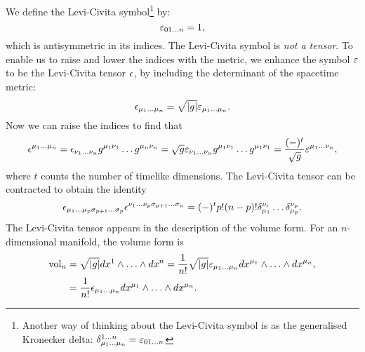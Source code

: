 We define the Levi-Civita symbol\footnote{Another way of thinking about the Levi-Civita symbol is as the generalised Kronecker delta: $\delta^{1 \ldots n}_{\mu_1 \ldots \mu_n} = {\varepsilon}_{01...n}$} by:
\begin{equation*}
	{\varepsilon}_{01...n} = 1 ,
\end{equation*}
which is antisymmetric in its indices. The Levi-Civita symbol is \emph{not a tensor}. To enable us to raise and lower the indices with the metric, we enhance the symbol ${\varepsilon}$ to be the Levi-Civita tensor ${\epsilon}$, by including the determinant of the spacetime metric:
\begin{equation*}
	{\epsilon}_{\mu_1 \ldots \mu_n} = \sqrt{|g|} {\varepsilon}_{\mu_1 \ldots \mu_n}.
\end{equation*}
Now we can raise the indices to find that
\begin{equation*}
	{\epsilon}^{\mu_1 \ldots \mu_n} = {\epsilon}_{\nu_1 \ldots \nu_n} g^{\mu_1 \nu_1} \ldots g^{\mu_n \nu_n} = \sqrt{g} {\varepsilon}_{\nu_1 \ldots \nu_n} g^{\mu_1 \nu_1} \ldots g^{\mu_1 \nu_1} = \frac{(-)^t}{\sqrt{g}} {\varepsilon}^{\mu_1 \ldots \nu_n},
\end{equation*}
where $t$ counts the number of timelike dimensions. The Levi-Civita tensor can be contracted to obtain the identity
\begin{equation*}
	{\epsilon}_{\mu_1 \ldots \mu_p \sigma_{p+1} \ldots \sigma_p} {\epsilon}^{\nu_1 \ldots \nu_p \sigma_{p+1} \ldots \sigma_n} = (-)^t p! (n-p)! \delta_{\mu_1}^{\nu_i} \ldots \delta_{\mu_p}^{\nu_p}.
\end{equation*}
The Levi-Civita tensor appears in the description of the volume form. For an $n$-dimensional manifold, the volume form is
\begin{equation*}
\begin{aligned}
	\text{vol}_n &= \sqrt{|g|} dx^{1} \wedge \ldots \wedge dx^{n} = \frac{1}{n!} \sqrt{|g|}  {\varepsilon}_{\mu_1 \ldots \mu_n} dx^{\mu_1} \wedge \ldots \wedge dx^{\mu_n}, \\
	&= \frac{1}{n!} {\epsilon}_{\mu_1 \ldots \mu_n} dx^{\mu_1} \wedge \ldots \wedge dx^{\mu_n}.
\end{aligned}
\end{equation*}

